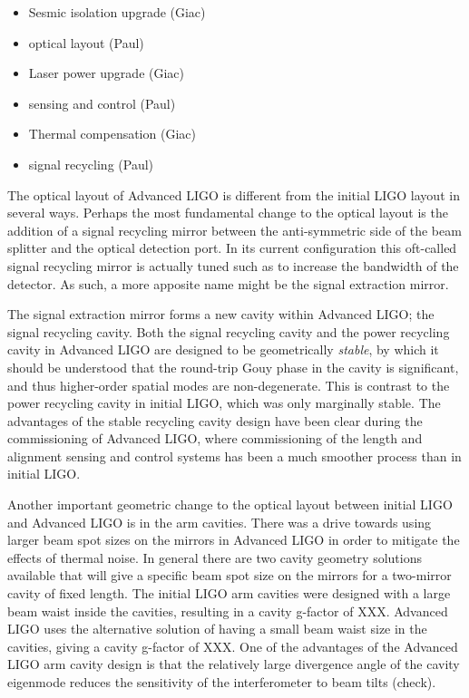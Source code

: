 \begin{itemize}
\item Sesmic isolation upgrade (Giac)
\item optical layout (Paul)
\item Laser power upgrade (Giac)
\item sensing and control (Paul)
\item Thermal compensation (Giac)
\item signal recycling (Paul)
\end{itemize}

The optical layout of Advanced LIGO is different from the initial LIGO layout in several ways. 
Perhaps the most fundamental change to the optical layout is the addition of a signal recycling 
mirror between the anti-symmetric side of the beam splitter and the optical detection port. 
In its current configuration this oft-called signal recycling mirror is actually tuned such as to 
increase the bandwidth of the detector. As such, a more apposite name might be the signal extraction mirror. 

The signal extraction mirror forms a new cavity within Advanced LIGO; the signal recycling cavity. 
Both the signal recycling cavity and the power recycling cavity in Advanced LIGO are designed to be 
geometrically \emph{stable}, by which it should be understood that the round-trip Gouy phase in the cavity 
is significant, and thus higher-order spatial modes are non-degenerate. 
This is contrast to the power recycling cavity in initial LIGO, which was only marginally stable. 
The advantages of the stable recycling cavity design have been clear during the commissioning of 
Advanced LIGO, where commissioning of the length and alignment sensing and control systems has 
been a much smoother process than in initial LIGO. 

Another important geometric change to the optical layout between initial LIGO and Advanced LIGO is 
in the arm cavities. There was a drive towards using larger beam spot sizes on the mirrors in Advanced 
LIGO in order to mitigate the effects of thermal noise. In general there are two cavity geometry solutions available 
that will give a specific beam spot size on the mirrors for a two-mirror cavity of fixed length. The initial LIGO 
arm cavities were designed with a large beam waist inside the cavities, resulting in a cavity g-factor of XXX. 
Advanced LIGO uses the alternative solution of having a small beam waist size in the cavities, giving a cavity g-factor of XXX. 
One of the advantages of the Advanced LIGO arm cavity design is that the relatively large divergence angle of the cavity 
eigenmode reduces the sensitivity of the interferometer to beam tilts (check). 

